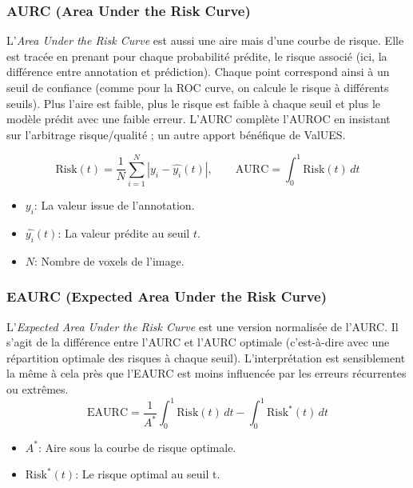 \documentclass[a4paper,french,bookmarks,12pt]{article}
\begin{document}
    \subsubsection*{AURC (Area Under the Risk Curve)}

    L'\emph{Area Under the Risk Curve} est aussi une aire mais d'une courbe de risque. Elle est tracée en prenant pour chaque probabilité prédite, le risque associé (ici, la différence entre annotation et prédiction). Chaque point correspond ainsi à un seuil de confiance (comme pour la ROC curve, on calcule le risque à différents seuils). Plus l'aire est faible, plus le risque est faible à chaque seuil et plus le modèle prédit avec une faible erreur. L'AURC complète l'AUROC en insistant sur l'arbitrage risque/qualité ; un autre apport bénéfique de ValUES.
        
        \[ \text{Risk}(t) = \frac{1}{N} \sum_{i=1}^{N} \left| y_i - \hat{y_i}(t) \right|,\qquad \text{AURC} = \int_{0}^{1} \text{Risk}(t) \, dt
        \]
        
\begin{itemize}

    \item \( y_i \): La valeur issue de l'annotation.
    \item \( \hat{y_i}(t) \): La valeur prédite au seuil \( t \).
    \item \( N \): Nombre de voxels de l'image.
\end{itemize}



        \vspace{0.2cm}
        \subsubsection*{EAURC (Expected Area Under the Risk Curve)}

        L'\emph{Expected Area Under the Risk Curve} est une version normalisée de l'AURC. Il s'agit de la différence entre l'AURC et l'AURC optimale (c'est-à-dire avec une répartition optimale des risques à chaque seuil). L'interprétation est sensiblement la même à cela près que l'EAURC est moins influencée par les erreurs récurrentes ou extrêmes.
        \[ \text{EAURC} = \frac{1}{A^*} \int_{0}^{1} \text{Risk}(t) \,dt - \int_{0}^{1} \text{Risk}^{*}(t) \, dt \]
        \begin{itemize}
            \item \( {A^*} \): Aire sous la courbe de risque optimale.
            \item \( \text{Risk}^*(t) \): Le risque optimal au seuil t.
        \end{itemize}
        
\end{document}
